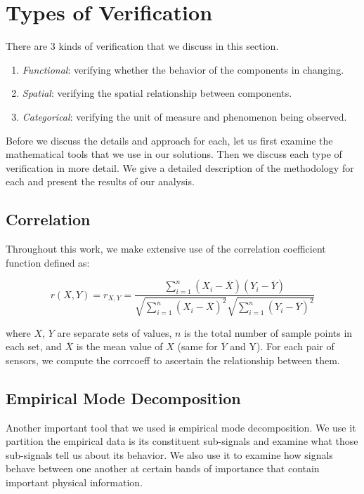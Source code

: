 \section{Types of Verification}
There are 3 kinds of verification that we discuss in this section.

\begin{enumerate}
\item \emph{Functional}: verifying whether the behavior of the components in changing.
\item \emph{Spatial}: 	verifying the spatial relationship between components.
\item \emph{Categorical}: verifying the unit of measure and phenomenon being observed.
\end{enumerate}

Before we discuss the details and approach for each, let us first examine the mathematical tools that we
use in our solutions.  Then we discuss each type of verification in more detail.  We give a detailed description 
of the methodology for each and present the results of our analysis.

\subsection{Correlation}
Throughout this work, we make extensive use of the correlation coefficient function defined as: 

\begin{displaymath}
r(X,Y) = r_{X, Y} = \frac{\sum_{i=1}^{n} (X_{i} - \overline{X})(Y_{i} - \overline{Y})}
{\sqrt{\sum_{i=1}^{n} (X_{i} - \overline{X})^2}\sqrt{\sum_{i=1}^{n} (Y_{i} - \overline{Y})^2}}
\end{displaymath}

where $X$, $Y$ are separate sets of values, $n$ is the total number of sample points in 
each set, and $\overline{X}$ is the mean value of $X$ (same for $\overline{Y}$ and Y).  %
For each pair of sensors, we compute the corrcoeff to ascertain the relationship between them.


\subsection{Empirical Mode Decomposition} \label{emd}
Another important tool that we used is empirical mode decomposition.  We use it partition the empirical data is its constituent
sub-signals and examine what those sub-signals tell us about its behavior.  We also use it to examine how signals behave between
one another at certain bands of importance that contain important physical information.

